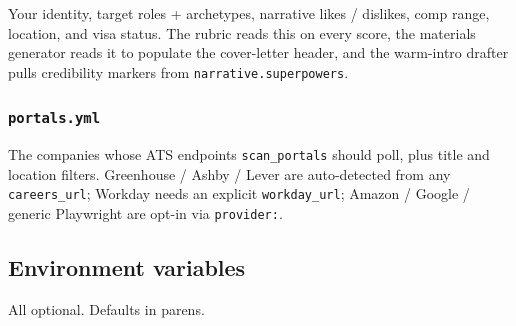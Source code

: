 \documentclass[11pt,letterpaper]{article}
\newcommand{\tool}[1]{\texttt{#1}}
\newcommand{\fpath}[1]{\texttt{#1}}
\begin{document}
Your identity, target roles + archetypes, narrative likes / dislikes, comp range, location, and visa status. The rubric reads this on every score, the materials generator reads it to populate the cover-letter header, and the warm-intro drafter pulls credibility markers from \texttt{narrative.superpowers}.

\subsubsection*{\fpath{portals.yml}}

The companies whose ATS endpoints \tool{scan\_portals} should poll, plus title and location filters. Greenhouse / Ashby / Lever are auto-detected from any \texttt{careers\_url}; Workday needs an explicit \texttt{workday\_url}; Amazon / Google / generic Playwright are opt-in via \texttt{provider:}.

\subsection*{Environment variables}

All optional. Defaults in parens.
\end{document}
